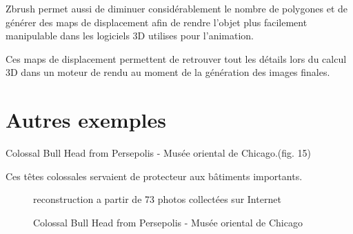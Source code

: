\documentclass[a4paper,10pt,french]{sphinxhowto}
\begin{document}
Zbrush permet aussi de diminuer considérablement le nombre de polygones et de générer des maps de displacement afin de rendre l'objet plus facilement manipulable dans les logiciels 3D utilises pour l'animation.

Ces maps de displacement permettent de retrouver tout les détails lors du calcul 3D dans un moteur de rendu au moment de la génération des images finales.


\section{Autres exemples}
\label{autres:autres-exemples}\label{autres::doc}
Colossal Bull Head from Persepolis - Musée oriental de Chicago.(fig. 15)

Ces têtes colossales servaient de protecteur aux bâtiments importants.
\begin{figure}[htbp]
\centering
\capstart

\caption{Colossal Bull Head from Persepolis - Musée oriental de Chicago}{\small 
reconstruction a partir de 73 photos collectées sur Internet
}\end{figure}



\renewcommand{\indexname}{Index}
\printindex
\end{document}
